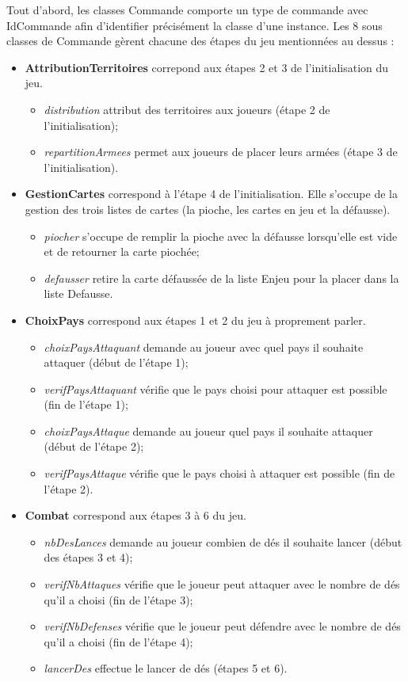 Tout d'abord, les classes Commande comporte un type de commande avec IdCommande afin d'identifier précisément la classe d’une instance. Les 8 sous classes de Commande gèrent chacune des étapes du jeu mentionnées au dessus :
\begin{itemize}
    \item \textbf{AttributionTerritoires} correpond aux étapes 2 et 3 de l'initialisation du jeu.
    \begin{itemize}
        \item \textit{distribution} attribut des territoires aux joueurs (étape 2 de l'initialisation);
        \item \textit{repartitionArmees} permet aux joueurs de placer leurs armées (étape 3 de l'initialisation).
    \end{itemize}
    
    \item \textbf{GestionCartes} correspond à l'étape 4 de l'initialisation. Elle s'occupe de la gestion des trois listes de cartes (la pioche, les cartes en jeu et la défausse).
    \begin{itemize}
        \item \textit{piocher} s'occupe de remplir la pioche avec la défausse lorsqu'elle est vide et de retourner la carte piochée;
        \item \textit{defausser} retire la carte défaussée de la liste Enjeu pour la placer dans la liste Defausse.
    \end{itemize}
    
    \item \textbf{ChoixPays} correspond aux étapes 1 et 2 du jeu à proprement parler. 
    \begin{itemize}
        \item \textit{choixPaysAttaquant} demande au joueur avec quel pays il souhaite attaquer (début de l'étape 1);
        \item \textit{verifPaysAttaquant} vérifie que le pays choisi pour attaquer est possible (fin de l'étape 1);
        \item \textit{choixPaysAttaque} demande au joueur quel pays il souhaite attaquer (début de l'étape 2);
        \item \textit{verifPaysAttaque} vérifie que le pays choisi à attaquer est possible (fin de l'étape 2).
    \end{itemize}
    
    \item \textbf{Combat} correspond aux étapes 3 à 6 du jeu. 
    \begin{itemize}
        \item \textit{nbDesLances} demande au joueur combien de dés il souhaite lancer (début des étapes 3 et 4);
        \item \textit{verifNbAttaques} vérifie que le joueur peut attaquer avec le nombre de dés qu'il a choisi (fin de l'étape 3);
        \item \textit{verifNbDefenses} vérifie que le joueur peut défendre avec le nombre de dés qu'il a choisi (fin de l'étape 4);
        \item \textit{lancerDes} effectue le lancer de dés (étapes 5 et 6).
    \end{itemize}
    

\end{itemize}

